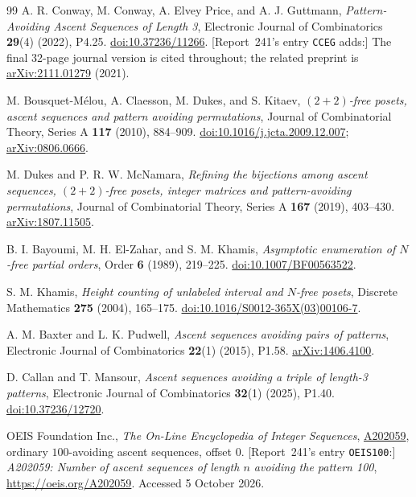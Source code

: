 \documentclass[11pt,letterpaper]{article}
\theoremstyle{remark}\newtheorem{remark}[theorem]{Remark}
\theoremstyle{remark}\newtheorem{wremark}{Remark}\renewcommand{\thewremark}{W\arabic{wremark}}
\theoremstyle{plain}\newtheorem{wcorollary}[wremark]{Corollary}
\begin{document}
\begin{thebibliography}{99}
A. R. Conway, M. Conway, A. Elvey Price, and A. J. Guttmann,
\emph{Pattern-Avoiding Ascent Sequences of Length 3},
Electronic Journal of Combinatorics \textbf{29}(4) (2022), P4.25.
\href{https://doi.org/10.37236/11266}{doi:10.37236/11266}.
[Report~241's entry \texttt{CCEG} adds:] The final 32-page journal version is cited throughout; the related preprint is
\href{https://arxiv.org/abs/2111.01279}{arXiv:2111.01279} (2021).

M. Bousquet-M\'elou, A. Claesson, M. Dukes, and S. Kitaev,
\emph{$(2+2)$-free posets, ascent sequences and pattern avoiding permutations},
Journal of Combinatorial Theory, Series A \textbf{117} (2010), 884--909.
\href{https://doi.org/10.1016/j.jcta.2009.12.007}{doi:10.1016/j.jcta.2009.12.007};
\href{https://arxiv.org/abs/0806.0666}{arXiv:0806.0666}.

M. Dukes and P. R. W. McNamara,
\emph{Refining the bijections among ascent sequences, $(2+2)$-free posets, integer matrices and pattern-avoiding permutations},
Journal of Combinatorial Theory, Series A \textbf{167} (2019), 403--430.
\href{https://arxiv.org/abs/1807.11505}{arXiv:1807.11505}.

B. I. Bayoumi, M. H. El-Zahar, and S. M. Khamis,
\emph{Asymptotic enumeration of $N$-free partial orders},
Order \textbf{6} (1989), 219--225.
\href{https://doi.org/10.1007/BF00563522}{doi:10.1007/BF00563522}.

S. M. Khamis,
\emph{Height counting of unlabeled interval and $N$-free posets},
Discrete Mathematics \textbf{275} (2004), 165--175.
\href{https://doi.org/10.1016/S0012-365X(03)00106-7}{doi:10.1016/S0012-365X(03)00106-7}.

A. M. Baxter and L. K. Pudwell,
\emph{Ascent sequences avoiding pairs of patterns},
Electronic Journal of Combinatorics \textbf{22}(1) (2015), P1.58.
\href{https://arxiv.org/abs/1406.4100}{arXiv:1406.4100}.

D. Callan and T. Mansour,
\emph{Ascent sequences avoiding a triple of length-3 patterns},
Electronic Journal of Combinatorics \textbf{32}(1) (2025), P1.40.
\href{https://doi.org/10.37236/12720}{doi:10.37236/12720}.

OEIS Foundation Inc., \emph{The On-Line Encyclopedia of Integer Sequences},
\href{https://oeis.org/A202059}{A202059}, ordinary $100$-avoiding ascent sequences, offset $0$.
[Report~241's entry \texttt{OEIS100}:] \emph{A202059: Number of ascent sequences of length $n$ avoiding the pattern 100},
\url{https://oeis.org/A202059}. Accessed 5 October 2026.


\end{thebibliography}
\end{document}

